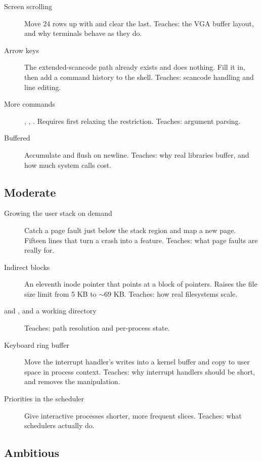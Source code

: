 \begin{description}
  \item[Screen scrolling] Move 24 rows up with  and clear the last. Teaches: the VGA
    buffer layout, and why terminals behave as they do.
  \item[Arrow keys] The extended-scancode path already exists and does nothing. Fill it in, then
    add a command history to the shell. Teaches: scancode handling and line editing.
  \item[More commands] , , . Requires first relaxing the
     restriction. Teaches: argument parsing.
  \item[Buffered ] Accumulate and flush on newline. Teaches: why real libraries buffer,
    and how much system calls cost.
\end{description}

\subsection{Moderate}

\begin{description}
  \item[Growing the user stack on demand] Catch a page fault just below the stack region and map a
    new page. Fifteen lines that turn a crash into a feature. Teaches: what page faults are really
    for.
  \item[Indirect blocks] An eleventh inode pointer that points at a block of pointers. Raises the
    file size limit from 5 KB to $\sim$69 KB. Teaches: how real filesystems scale.
  \item[ and , and a working directory] Teaches: path resolution and per-process
    state.
  \item[Keyboard ring buffer] Move the interrupt handler's writes into a kernel buffer and copy to
    user space in process context. Teaches: why interrupt handlers should be short, and removes the
     manipulation.
  \item[Priorities in the scheduler] Give interactive processes shorter, more frequent slices.
    Teaches: what schedulers actually do.
\end{description}

\subsection{Ambitious}

